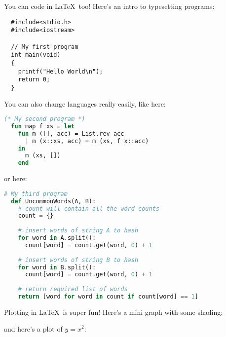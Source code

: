 \documentclass[]{plaid-homework}
\begin{document}
\newpage


You can code in \LaTeX\ too! Here's an intro to typesetting programs:
\begin{lstlisting}
  #include<stdio.h> 
  #include<iostream>

  // My first program
  int main(void)
  {
    printf("Hello World\n");
    return 0;
  }
\end{lstlisting}
You can also change languages really easily, like here:
\begin{lstlisting}[language=sml]
  (* My second program *)
  fun map f xs = let
    fun m ([], acc) = List.rev acc
      | m (x::xs, acc) = m (xs, f x::acc)
    in
      m (xs, [])
    end
\end{lstlisting}
or here:
\begin{lstlisting}[language=Python]
  # My third program
  def UncommonWords(A, B): 
    # count will contain all the word counts 
    count = {} 
      
    # insert words of string A to hash 
    for word in A.split(): 
      count[word] = count.get(word, 0) + 1
      
    # insert words of string B to hash 
    for word in B.split(): 
      count[word] = count.get(word, 0) + 1
  
    # return required list of words 
    return [word for word in count if count[word] == 1] 
\end{lstlisting}

\newpage

Plotting in \LaTeX\ is super fun! Here's a mini graph with some shading:
\begin{center}
\end{center}
and here's a plot of $y = x^2$:
\begin{center}
\end{center}
\end{document}
